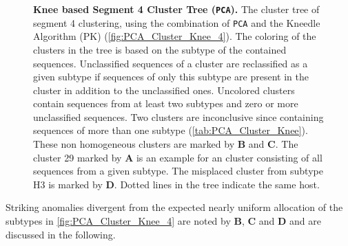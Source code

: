 \begin{figure}[!hbt]
    \caption[Knee based Segment 4 Cluster Tree (\texttt{PCA})]{\textbf{Knee based Segment 4 Cluster Tree (\texttt{PCA}).} The cluster tree of segment 4 clustering, using the combination of \texttt{PCA} and the Kneedle Algorithm (PK) (\autoref{fig:PCA_Cluster_Knee_4}). The coloring of the clusters in the tree is based on the subtype of the contained sequences. Unclassified sequences of a cluster are reclassified as a given subtype if sequences of only this subtype are present in the cluster in addition to the unclassified ones. Uncolored clusters contain sequences from at least two subtypes and zero or more unclassified sequences. Two clusters are inconclusive since containing sequences of more than one subtype (\autoref{tab:PCA_Cluster_Knee}). These non homogeneous clusters are marked by \textbf{\textsf{B}} and \textbf{\textsf{C}}. The cluster 29 marked by \textbf{\textsf{A}} is an example for an cluster consisting of all sequences from a given subtype. The misplaced cluster from subtype H3 is marked by \textbf{\textsf{D}}. Dotted lines in the tree indicate the same host.}
    \label{fig:PCA_Clusteree_Knee_4}
\end{figure}

Striking anomalies divergent from the expected nearly uniform allocation of the subtypes in \autoref{fig:PCA_Cluster_Knee_4} are noted by \textbf{\textsf{B}}, \textbf{\textsf{C}} and \textbf{\textsf{D}} and are discussed in the following. 